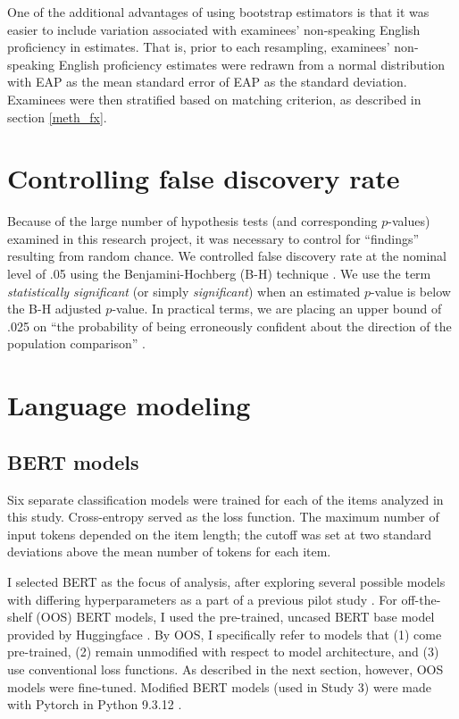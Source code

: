 \documentclass [PhD] {uclathes}
\begin{document}
One of the additional advantages of using bootstrap estimators is that it was easier to include variation associated with examinees’ non-speaking English proficiency in estimates. That is, prior to each resampling, examinees’ non-speaking English proficiency estimates were redrawn from a normal distribution with EAP as the mean standard error of EAP as the standard deviation. Examinees were then stratified based on matching criterion, as described in section \ref{meth_fx}. 

\section{Controlling false discovery rate}
\label{meth_bh}

Because of the large number of hypothesis tests (and corresponding $p$-values) examined in this research project, it was necessary to control for “findings” resulting from random chance. We controlled false discovery rate at the nominal level of .05 using the Benjamini-Hochberg (B-H) technique \citep{benjamini1995controlling}. We use the term \emph{statistically significant} (or simply \emph{significant}) when an estimated $p$-value is below the B-H adjusted $p$-value. In practical terms, we are placing an upper bound of .025 on “the probability of being erroneously confident about the direction of the population comparison” \citep[][p. 43]{williams1999controlling}.

\section{Language modeling}
\label{sec:meth_bert}

\subsection{BERT models}

Six separate classification models were trained for each of the items analyzed in this study. Cross-entropy served as the loss function. The maximum number of input tokens depended on the item length; the cutoff was set at two standard deviations above the mean number of tokens for each item. 

I selected BERT as the focus of analysis, after exploring several possible models with differing hyperparameters as a part of a previous pilot study \citep{kwako2022using}. For off-the-shelf (OOS) BERT models, I used the pre-trained, uncased BERT base model provided by Huggingface \citep{wolf_transformers_2020, devlin2018}. By OOS, I specifically refer to models that (1) come pre-trained, (2) remain unmodified with respect to model architecture, and (3) use conventional loss functions. As described in the next section, however, OOS models were fine-tuned. Modified BERT models (used in Study 3) were made with Pytorch \citep{paszke_pytorch_2019} in Python 9.3.12 \citep{python2022}. 
\end{document}
